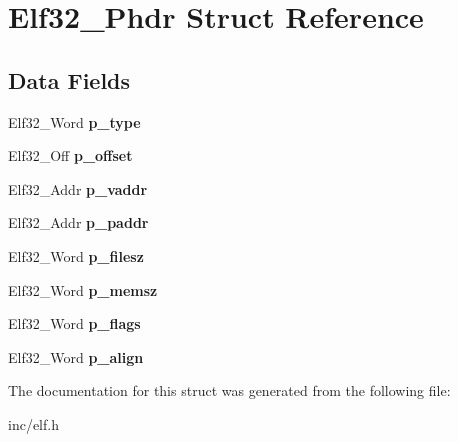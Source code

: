 \hypertarget{structElf32__Phdr}{}\section{Elf32\+\_\+\+Phdr Struct Reference}
\label{structElf32__Phdr}
\subsection*{Data Fields}
\begin{DoxyCompactItemize}
\item 
Elf32\+\_\+\+Word {\bfseries p\+\_\+type}\hypertarget{structElf32__Phdr_a8b1d2942ddb9abcb85db1429b5116923}{}\label{structElf32__Phdr_a8b1d2942ddb9abcb85db1429b5116923}

\item 
Elf32\+\_\+\+Off {\bfseries p\+\_\+offset}\hypertarget{structElf32__Phdr_ac590d4c4b26104216e53058b5b03eef0}{}\label{structElf32__Phdr_ac590d4c4b26104216e53058b5b03eef0}

\item 
Elf32\+\_\+\+Addr {\bfseries p\+\_\+vaddr}\hypertarget{structElf32__Phdr_a01a298ebc899bcf9c23211a7bf1155a6}{}\label{structElf32__Phdr_a01a298ebc899bcf9c23211a7bf1155a6}

\item 
Elf32\+\_\+\+Addr {\bfseries p\+\_\+paddr}\hypertarget{structElf32__Phdr_af18f0a179a5fca09e3c04bcdce3fac2f}{}\label{structElf32__Phdr_af18f0a179a5fca09e3c04bcdce3fac2f}

\item 
Elf32\+\_\+\+Word {\bfseries p\+\_\+filesz}\hypertarget{structElf32__Phdr_ac9151f2e11001284bf1c7d2d2659555c}{}\label{structElf32__Phdr_ac9151f2e11001284bf1c7d2d2659555c}

\item 
Elf32\+\_\+\+Word {\bfseries p\+\_\+memsz}\hypertarget{structElf32__Phdr_ada1cdd3d6ccb79a17bed0e3c21379c84}{}\label{structElf32__Phdr_ada1cdd3d6ccb79a17bed0e3c21379c84}

\item 
Elf32\+\_\+\+Word {\bfseries p\+\_\+flags}\hypertarget{structElf32__Phdr_a35c457e6828894b7b275730593802050}{}\label{structElf32__Phdr_a35c457e6828894b7b275730593802050}

\item 
Elf32\+\_\+\+Word {\bfseries p\+\_\+align}\hypertarget{structElf32__Phdr_afd09d9e4297b13fc94fd57d09f2a9f70}{}\label{structElf32__Phdr_afd09d9e4297b13fc94fd57d09f2a9f70}

\end{DoxyCompactItemize}


The documentation for this struct was generated from the following file\+:\begin{DoxyCompactItemize}
\item 
inc/elf.\+h\end{DoxyCompactItemize}
